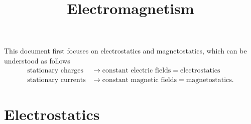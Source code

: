 \documentclass[11pt]{article}
\title{Electromagnetism}
\begin{document}
\maketitle

This document first focuses on electrostatics and magnetostatics, which can be understood as follows
\begin{align}
    \text{stationary charges} &\to \text{constant electric fields} = \text{electrostatics} \nonumber \\
    \text{stationary currents} &\to \text{constant magnetic fields} = \text{magnetostatics} .
\end{align}

\section{Electrostatics}
\end{document}
